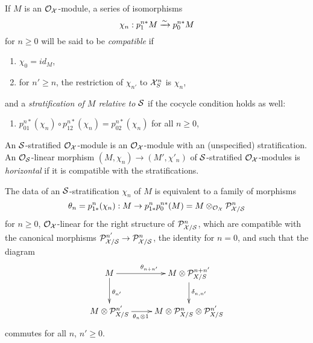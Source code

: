 \documentclass{article}
\theoremstyle{change}
\numberwithin{equation}{subsubsection}
\begin{document}
If $M$ is an ${\cal O}_{\cal X}$-module, 
a series of isomorphisms 
\begin{equation}
  \label{eq:stratification-algebraic}
  \chi_n:p_1^{n*}M\xrightarrow{\sim} p_0^{n*}M  
\end{equation}
for $n\ge0$ will be said to be \textit{compatible} if
\begin{enumerate}
\item $\chi_0=id_M$,
\item for $n'\ge n$, the restriction of $\chi_{n'}$ to ${\cal X}_S^n$ is
  $\chi_n$,
\end{enumerate}
and a \textit{stratification of $M$ relative to ${\cal S}$} if the cocycle
condition holds as well:
\begin{enumerate}
\item
  $p^{n*}_{01}(\chi_n)\circ p^{n*}_{12}(\chi_n)=p^{n*}_{02}(\chi_n)$
  for all $n\ge0$,
\end{enumerate}
An ${\cal S}$-stratified ${\cal O}_{\cal X}$-module is an ${\cal O}_{\cal X}$-module with an
(unspecified) stratification. An ${\cal O}_{\cal S}$-linear morphism
$(M,\chi_n)\to(M',\chi'_n)$ of ${\cal S}$-stratified ${\cal O}_{\cal X}$-modules is
\textit{horizontal} if it is compatible with the stratifications.


The data of an ${\cal S}$-stratification $\chi_n$ of $M$ is equivalent to a
family of morphisms
\begin{equation}
  \label{eq:stratification-theta}
  \theta_n=p^{n}_{1*}(\chi_n):M\to p^{n}_{1*}p^{n*}_0(M)
  =M\otimes_{{\cal O}_{\cal X}}{\cal P}^n_{{\cal X}/{\cal S}}
\end{equation}
for $n\ge0$, ${\cal O}_{\cal X}$-linear for the right structure of
${\cal P}^n_{{\cal X}/{\cal S}}$, which are compatible with the canonical morphisms
${\cal P}^{n'}_{{\cal X}/{\cal S}}\to{\cal P}^n_{{\cal X}/{\cal S}}$, the identity for $n=0$, and
such that the diagram
\begin{equation}
  \label{eq:cocycle-in-terms-of-theta}
  \xymatrix{
    M\ar[d]^{\theta_{n'}}\ar[r]^{\theta_{n+n'}}
    &M\tens\cP^{n+n'}_{X/S}\ar[d]^{\delta_{n,n'}}\\
    M\tens\cP^{n'}_{X/S}\ar[r]_{\theta_n\tens1\qquad}
    &M\tens\cP^n_{X/S}\tens\cP^{n'}_{X/S}
  }
\end{equation}
commutes for all $n$, $n'\ge0$. 
\end{document}
